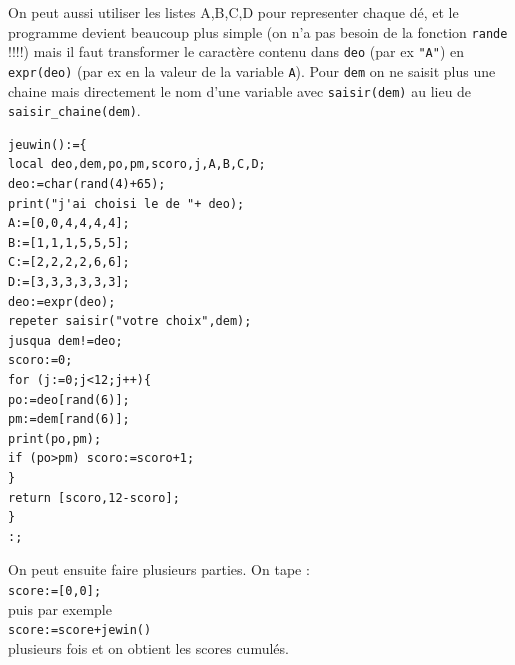 \documentclass[a4paper,11pt]{book}
\begin{document}
On peut aussi utiliser les listes A,B,C,D pour representer chaque d\'e, et le 
programme devient beaucoup plus simple (on n'a pas besoin de la fonction
{\tt rande} !!!!) mais il faut transformer le caract\`ere contenu dans 
{\tt deo} (par ex {\tt "A"}) en {\tt expr(deo)} (par ex en la valeur de la 
variable {\tt A}). Pour {\tt dem} on ne saisit plus une chaine mais directement
le nom d'une variable avec {\tt saisir(dem)} au lieu de {\tt saisir\_chaine(dem)}.
\begin{verbatim}
jeuwin():={
local deo,dem,po,pm,scoro,j,A,B,C,D;
deo:=char(rand(4)+65);
print("j'ai choisi le de "+ deo);
A:=[0,0,4,4,4,4];
B:=[1,1,1,5,5,5];
C:=[2,2,2,2,6,6];
D:=[3,3,3,3,3,3];
deo:=expr(deo);
repeter saisir("votre choix",dem);
jusqua dem!=deo;
scoro:=0;
for (j:=0;j<12;j++){
po:=deo[rand(6)];
pm:=dem[rand(6)];
print(po,pm);
if (po>pm) scoro:=scoro+1;
}
return [scoro,12-scoro];
}
:;
\end{verbatim}
On peut ensuite faire plusieurs parties. On tape :\\
{\tt score:=[0,0];}\\
puis par exemple\\
{\tt score:=score+jewin()}\\
plusieurs fois et on obtient les scores cumul\'es.
\end{document}
